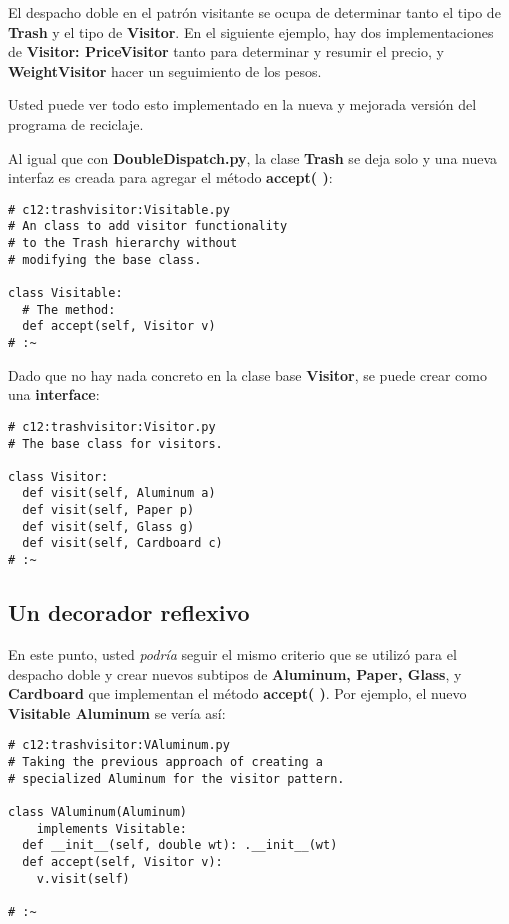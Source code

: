 El despacho doble en el patrón visitante se ocupa de determinar tanto el tipo de \textbf{Trash} y el tipo de \textbf{Visitor}. En el siguiente ejemplo, hay dos implementaciones de \textbf{Visitor: PriceVisitor} tanto para determinar y resumir el precio, y \textbf{WeightVisitor} hacer un seguimiento de los pesos.      \newline

Usted puede ver todo esto implementado en la nueva y mejorada versión del programa de reciclaje.        \newline

Al igual que con \textbf{DoubleDispatch.py}, la clase \textbf{Trash} se deja solo y una nueva interfaz es creada para agregar el método \textbf{accept( )}: \newline

\begin{lstlisting} 
# c12:trashvisitor:Visitable.py 
# An class to add visitor functionality  
# to the Trash hierarchy without  
# modifying the base class. 

class Visitable: 
  # The method: 
  def accept(self, Visitor v) 
# :~ 
\end{lstlisting}

Dado que no hay nada concreto en la clase base \textbf{Visitor}, se puede crear como una \textbf{interface}: \newline

\begin{lstlisting} 
# c12:trashvisitor:Visitor.py 
# The base class for visitors. 

class Visitor: 
  def visit(self, Aluminum a) 
  def visit(self, Paper p) 
  def visit(self, Glass g) 
  def visit(self, Cardboard c) 
# :~ 
\end{lstlisting}


\subsection*{Un decorador reflexivo}
\label{subsec:udr}



En este punto, usted \textit{podría} seguir el mismo criterio que se utilizó para el despacho doble y crear nuevos subtipos de \textbf{Aluminum, Paper, Glass}, y \textbf{Cardboard} que implementan el método \textbf{accept( )}. Por ejemplo, el nuevo \textbf{Visitable Aluminum} se vería así: \newline

\begin{lstlisting} 
# c12:trashvisitor:VAluminum.py 
# Taking the previous approach of creating a 
# specialized Aluminum for the visitor pattern. 

class VAluminum(Aluminum)  
    implements Visitable: 
  def __init__(self, double wt): .__init__(wt)  
  def accept(self, Visitor v): 
    v.visit(self) 

# :~ 
\end{lstlisting}

